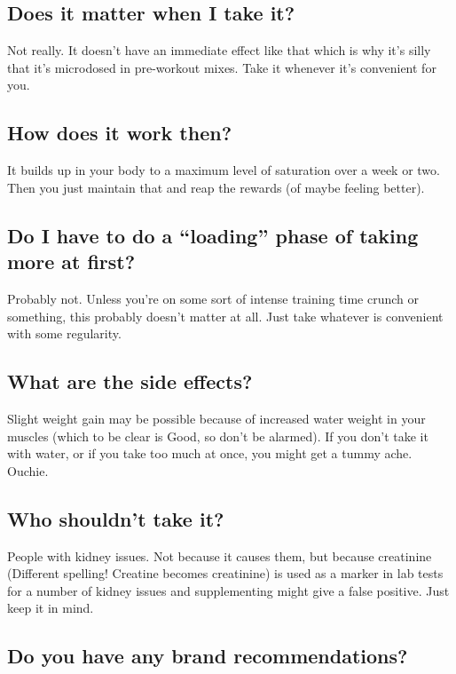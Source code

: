 \documentclass{article}
\begin{document}
\subsection{Does it matter when I take it?}

Not really. It doesn’t have an immediate effect like that which is why it’s silly that it’s microdosed in pre-workout mixes. Take it whenever it’s convenient for you.

\subsection{How does it work then?}

It builds up in your body to a maximum level of saturation over a week or two. Then you just maintain that and reap the rewards (of maybe feeling better).

\subsection{Do I have to do a “loading” phase of taking more at first?}

Probably not. Unless you’re on some sort of intense training time crunch or something, this probably doesn’t matter at all. Just take whatever is convenient with some regularity.

\subsection{What are the side effects?}

Slight weight gain may be possible because of increased water weight in your muscles (which to be clear is Good, so don't be alarmed). If you don’t take it with water, or if you take too much at once, you might get a tummy ache. Ouchie.

\subsection{Who shouldn’t take it?}

People with kidney issues. Not because it causes them, but because creatinine (Different spelling! Creatine becomes creatinine) is used as a marker in lab tests for a number of kidney issues and supplementing might give a false positive. Just keep it in mind.

\subsection{Do you have any brand recommendations?}
\end{document}
